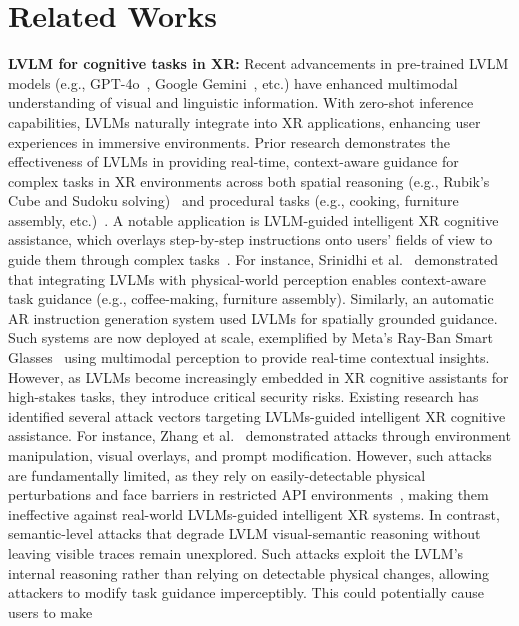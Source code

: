 \documentclass[sigconf,review,anonymous]{acmart}
\begin{document}
 

\section{Related Works}


\textbf{LVLM for cognitive tasks in XR:} Recent advancements in pre-trained LVLM models (e.g., GPT-4o~\cite{achiam2023gpt}, Google Gemini~\cite{team2023gemini}, etc.) have enhanced multimodal understanding of visual and linguistic information. With zero-shot inference capabilities, LVLMs naturally integrate into XR applications, enhancing user experiences in immersive environments. Prior research demonstrates the effectiveness of LVLMs in providing real-time, context-aware guidance for complex tasks in XR environments across both spatial reasoning (e.g., Rubik's Cube and Sudoku solving)~\cite{ren2025rubikon,hajahmadi2024investigating, dugar2024augmented, qu2024looking} and procedural tasks (e.g., cooking, furniture assembly, etc.)~\cite{majil2022augmented, ghasemi2023embedding, bonnetto2025epfl, lau2025adaptive, vir2024archef}. A notable application is LVLM-guided intelligent XR cognitive assistance, which overlays step-by-step instructions onto users' fields of view to guide them through complex tasks~\cite{srinidhi2024xair, zhao2025guided, qorbani2025teaching}.  For instance, Srinidhi et al.~\cite{srinidhi2024xair} demonstrated that integrating LVLMs with physical-world perception enables context-aware task guidance (e.g., coffee-making, furniture assembly). Similarly, an automatic AR instruction generation system used LVLMs for spatially grounded guidance. Such systems are now deployed at scale, exemplified by Meta's Ray-Ban Smart Glasses~\cite{waisberg2024meta} using multimodal perception to provide real-time contextual insights. However, as LVLMs become increasingly embedded in XR cognitive assistants for high-stakes tasks, they introduce critical security risks. Existing research has identified several attack vectors targeting LVLMs-guided intelligent XR cognitive assistance. For instance, Zhang et al.~\cite{zhang2025evil} demonstrated attacks through environment manipulation, visual overlays, and prompt modification. However, such attacks are fundamentally limited, as they rely on easily-detectable physical perturbations and face barriers in restricted API environments~\cite{huang2024effective,liu2024formalizing,bhagwatkar2024improving}, making them ineffective against real-world LVLMs-guided intelligent XR systems. In contrast, semantic-level attacks that degrade LVLM visual-semantic reasoning without leaving visible traces remain unexplored. Such attacks exploit the LVLM's internal reasoning rather than relying on detectable physical changes, allowing attackers to modify task guidance imperceptibly. This could potentially cause users to make 
\end{document}
